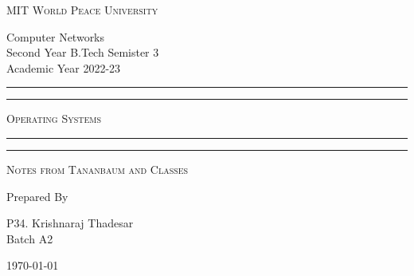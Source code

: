 \documentclass[11pt]{article}
\begin{document}
\begin{titlepage}
	\centering


	\huge\textsc{
		MIT World Peace University
	}\\

	\vspace{0.75\baselineskip} %

	\LARGE{
		Computer Networks\\
		Second Year B.Tech Semister 3\\
		Academic Year 2022-23
	}

	\vfill %


	\rule{\textwidth}{1.6pt}\vspace*{-\baselineskip}\vspace*{2pt}
	\rule{\textwidth}{0.6pt}
	\vspace{0.75\baselineskip} %



	\huge{\textsc{
			Operating Systems
		}} \\



	\vspace{0.5\baselineskip} %
	\rule{\textwidth}{0.6pt}\vspace*{-\baselineskip}\vspace*{2.8pt}
	\rule{\textwidth}{1.6pt}

	\vspace{1\baselineskip} %


	\LARGE\textsc{
		Notes from Tananbaum and Classes
	} %
	\vfill


	Prepared By
	\vspace{0.5\baselineskip} %

	\Large{
		P34. Krishnaraj Thadesar\\
		\vspace{1cm}
		Batch A2
	}


	\vspace{0.5\baselineskip} %
	\today

\end{titlepage}
\end{document}
